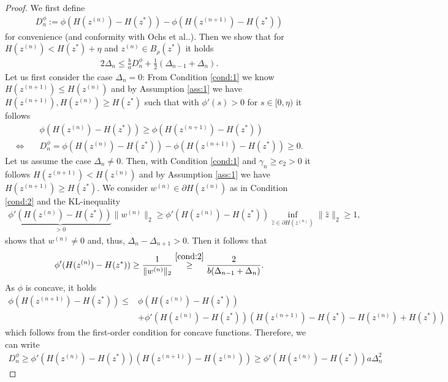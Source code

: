 \documentclass[onecolumn,final,a4paper,13pt,reqno]{siamart}
\makeatletter
\DeclareRobustCommand\onedot{\futurelet\@let@token\@onedot}
\def\@onedot{\ifx\@let@token.\else.\null\fi\xspace}
\def\etal{{et al}\onedot}
\makeatother
\begin{document}
\begin{proof}
	We first define
	\begin{align}
		D_n^\phi := \phi(H(z^{(n)}) - H(z^\ast)) - \phi(H(z^{(n + 1)}) - H(z^\ast))
	\end{align}
	for convenience (and conformity with Ochs \etal). Then we show that for $H(z^{(n)}) < H(z^\ast) + \eta$ and $z^{(n)} \in B_\rho(z^\ast)$ it holds
	\begin{align}
		2\Delta_n \leq \frac{b}{a}D_n^\phi + \frac{1}{2}(\Delta_{n - 1} + \Delta_{n})\label{eq:lemma-claim-1}.
	\end{align}
	Let us first consider the case $\Delta_n = 0$: From Condition \ref{cond:1} we know $H(z^{(n + 1)}) \leq H(z^{(n)})$ and by Assumption \ref{ass:1} we have $H(z^{(n + 1)}), H(z^{(n)}) \geq H(z^\ast)$ such that with $\phi'(s) > 0$ for $s \in [0,\eta)$ it follows
	\begin{align}
		&\phi(H(z^{(n)}) - H(z^\ast)) \geq \phi(H(z^{(n + 1)}) - H(z^\ast))\\
		\Leftrightarrow\quad& D_n^\phi = \phi(H(z^{(n)}) - H(z^\ast)) - \phi(H(z^{(n + 1)}) - H(z^\ast)) \geq 0.
	\end{align}
	Let us assume the case $\Delta_n \neq 0$. Then, with Condition \ref{cond:1} and $\gamma_n \geq c_2 > 0$ it follows $H(z^{(n + 1)}) < H(z^{(n)})$ and by Assumption \ref{ass:1} we have $H(z^{(n + 1)}) \geq H(z^\ast)$. We consider $w^{(n)} \in \partial H(z^{(n)})$ as in Condition \ref{cond:2} and the KL-inequality
	\begin{align}
		\underbrace{\phi'(H(z^{(n)}) - H(z^\ast))}_{> 0} \|w^{(n)}\|_2 \geq \phi'(H(z^{(n)}) - H(z^\ast)) \inf_{\hat{z} \in \partial H(z^{(n)})} \|\hat{z}\|_2 \geq 1,
	\end{align}
	shows that $w^{(n)} \neq 0$ and, thus, $\Delta_n - \Delta_{n + 1} > 0$. Then it follows that
	\begin{align}
		\phi'(H(z^{(n)}) - H(z^\ast)) \geq \frac{1}{\|w^{(n)}\|_2} \overset{\ref{cond:2}}{\geq} \frac{2}{b(\Delta_{n - 1} + \Delta_n)}.\label{eq:lemma-inequality-1}
	\end{align}
	As $\phi$ is concave, it holds
	\begin{align}
		\phi(H(z^{(n + 1)}) - H(z^\ast)) \leq &\phi(H(z^{(n)}) - H(z^\ast))\\
		&+ \phi'(H(z^{(n)}) - H(z^\ast))(H(z^{(n + 1)}) - H(z^\ast) - H(z^{(n)}) + H(z^\ast))
	\end{align}
	which follows from the first-order condition for concave functions. Therefore, we can write
	\begin{align}
		D_n^\phi \geq \phi'(H(z^{(n)}) - H(z^\ast))(H(z^{(n + 1)}) - H(z^{(n)})) \geq \phi'(H(z^{(n)}) - H(z^\ast))a\Delta_n^2\label{eq:lemma-inequality-2}

\end{align}
\end{proof}
\end{document}
